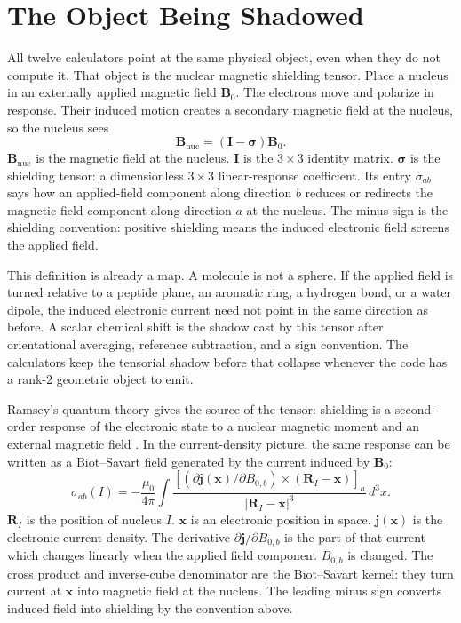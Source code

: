 \documentclass[11pt]{article}
\newcommand{\dd}{\,d}
\begin{document}
\tableofcontents
\clearpage

\section{The Object Being Shadowed}

All twelve calculators point at the same physical object, even when they do not
compute it. That object is the nuclear magnetic shielding tensor. Place a
nucleus in an externally applied magnetic field \(\bm B_0\). The electrons move
and polarize in response. Their induced motion creates a secondary magnetic
field at the nucleus, so the nucleus sees
\[
  \bm B_{\mathrm{nuc}}=(\bm I-\bm\sigma)\bm B_0 .
\]
\(\bm B_{\mathrm{nuc}}\) is the magnetic field at the nucleus. \(\bm I\) is
the \(3\times3\) identity matrix. \(\bm\sigma\) is the shielding tensor: a
dimensionless \(3\times3\) linear-response coefficient. Its entry
\(\sigma_{ab}\) says how an applied-field component along direction \(b\)
reduces or redirects the magnetic field component along direction \(a\) at the
nucleus. The minus sign is the shielding convention: positive shielding means
the induced electronic field screens the applied field.

This definition is already a map. A molecule is not a sphere. If the applied
field is turned relative to a peptide plane, an aromatic ring, a hydrogen bond,
or a water dipole, the induced electronic current need not point in the same
direction as before. A scalar chemical shift is the shadow cast by this tensor
after orientational averaging, reference subtraction, and a sign convention. The
calculators keep the tensorial shadow before that collapse whenever the code has
a rank-2 geometric object to emit.

Ramsey's quantum theory gives the source of the tensor: shielding is a
second-order response of the electronic state to a nuclear magnetic moment and
an external magnetic field \cite{ramsey1950,facelli2011}. In the current-density
picture, the same response can be written as a Biot--Savart field generated by
the current induced by \(\bm B_0\):
\[
  \sigma_{ab}(I)
  =
  -\frac{\mu_0}{4\pi}
  \int
  \frac{
    \left[
      \left(\partial \bm j(\bm x)/\partial B_{0,b}\right)
      \times
      (\bm R_I-\bm x)
    \right]_a
  }
  {|\bm R_I-\bm x|^3}
  \dd^3 x .
\]
\(\bm R_I\) is the position of nucleus \(I\). \(\bm x\) is an electronic
position in space. \(\bm j(\bm x)\) is the electronic current density. The
derivative \(\partial \bm j/\partial B_{0,b}\) is the part of that current
which changes linearly when the applied field component \(B_{0,b}\) is changed.
The cross product and inverse-cube denominator are the Biot--Savart kernel:
they turn current at \(\bm x\) into magnetic field at the nucleus. The leading
minus sign converts induced field into shielding by the convention above.
\end{document}
